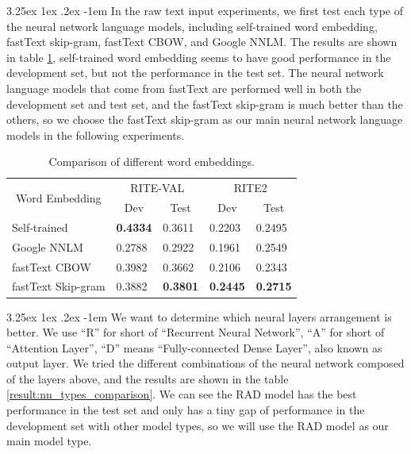 \documentclass[12pt]{article}
\makeatletter
\renewcommand\paragraph{\@startsection{paragraph}{5}{\z@}%
  {3.25ex \@plus1ex \@minus.2ex}%
  {-1em}%
  {\normalfont\normalsize\bfseries}}
\makeatother
\begin{document}
\begin{CJK*}{UTF8}{bkai}
\begin{spacing}{1.77}
\paragraph{}
In the raw text input experiments, we first test each type of the neural network language models, including self-trained word embedding, fastText skip-gram, fastText CBOW, and Google NNLM. The results are shown in table \ref{result:nnlm_comparison}, self-trained word embedding seems to have good performance in the development set, but not the performance in the test set. The neural network language models that come from fastText are performed well in both the development set and test set, and the fastText skip-gram is much better than the others, so we choose the fastText skip-gram as our main neural network language models in the following experiments.

\begin{table}[H]
  \centering
  \setlength{\extrarowheight}{-3pt}
  \begin{tabular}{|l|l|l|l|l|}
  \hline
  \multicolumn{1}{|c|}{\multirow{2}{*}{Word   Embedding}} & \multicolumn{2}{c|}{RITE-VAL} & \multicolumn{2}{c|}{RITE2} \\ \cline{2-5}
  \multicolumn{1}{|c|}{} & \multicolumn{1}{c|}{Dev} & \multicolumn{1}{c|}{Test} & \multicolumn{1}{c|}{Dev} & \multicolumn{1}{c|}{Test} \\ \hline
  Self-trained & \textbf{0.4334} & 0.3611 & 0.2203 & 0.2495 \\ \hline
  Google NNLM & 0.2788 & 0.2922 & 0.1961 & 0.2549 \\ \hline
  fastText CBOW & 0.3982 & 0.3662 & 0.2106 & 0.2343 \\ \hline
  fastText Skip-gram & 0.3882 & \textbf{0.3801} & \textbf{0.2445} & \textbf{0.2715} \\ \hline
  \end{tabular}
  \caption{Comparison of different word embeddings.}
  \label{result:nnlm_comparison}
\end{table}

\paragraph{}
We want to determine which neural layers arrangement is better. We use ``R'' for short of ``Recurrent Neural Network'', ``A'' for short of ``Attention Layer'', ``D'' means ``Fully-connected Dense Layer'', also known as output layer. We tried the different combinations of the neural network composed of the layers above, and the results are shown in the table \ref{result:nn_types_comparison}. We can see the RAD model has the best performance in the test set and only has a tiny gap of performance in the development set with other model types, so we will use the RAD model as our main model type.


\end{spacing}
\end{CJK*}
\end{document}
